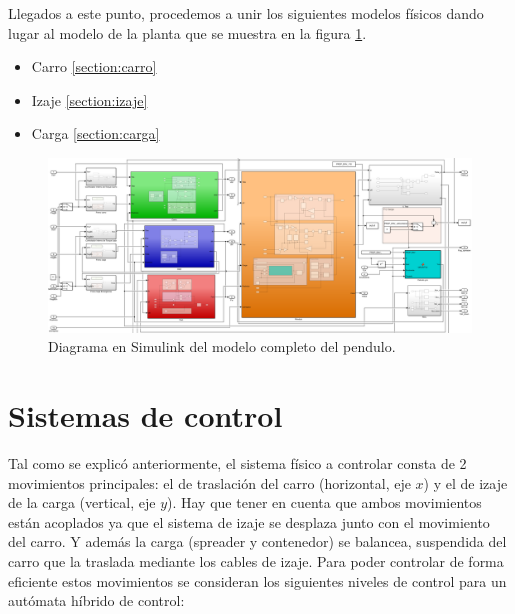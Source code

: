 \documentclass[11pt]{article}
\begin{document}
\newpage

Llegados a este punto, procedemos a unir los siguientes modelos físicos dando lugar al modelo de la planta que se muestra en la figura \ref{fig:sistema_completo}.
\begin{itemize}
	\item Carro \ref{section:carro}
	\item Izaje \ref{section:izaje}
	\item Carga \ref{section:carga}
\end{itemize}

\begin{figure}[h!]
	\centering
	\includegraphics[width=1\textwidth]{images/imagen_11_sistema_completo.png}
	\caption{Diagrama en Simulink del modelo completo del pendulo.}
	\label{fig:sistema_completo}
\end{figure}



\section{Sistemas de control}

Tal como se explicó anteriormente, el sistema físico a controlar consta de 2 movimientos principales: el de traslación del carro (horizontal, eje $x$) y el de izaje de la carga (vertical, eje $y$). Hay que tener en cuenta que ambos movimientos están acoplados ya que el sistema de izaje se desplaza junto con el movimiento del carro. Y además la carga (spreader y contenedor) se balancea, suspendida del carro que la traslada mediante los cables de izaje. Para poder controlar de forma eficiente estos movimientos se consideran los siguientes niveles de control para un autómata híbrido de control:
\end{document}
